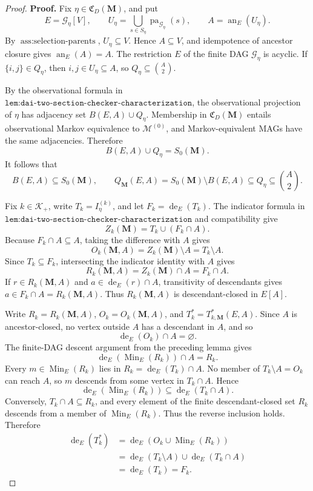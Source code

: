 \documentclass{article}
\begin{document}
\begin{proof}
\textbf{Proof.}
Fix \(\eta\in\mathfrak C_D(\mathbf M)\), and put
\[
E=\mathcal G_\eta[V],
\qquad
U_\eta=\bigcup_{s\in S_\eta}\operatorname{pa}_{\mathcal G_\eta}(s),
\qquad
A=\operatorname{an}_E(U_\eta).
\]
By \(\operatorname{ass{:}selection\text{-}parents}\), \(U_\eta\subseteq V\).  Hence \(A\subseteq V\), and idempotence of ancestor closure gives \(\operatorname{an}_E(A)=A\).  The restriction \(E\) of the finite DAG \(\mathcal G_\eta\) is acyclic.  If \(\{i,j\}\in Q_\eta\), then \(i,j\in U_\eta\subseteq A\), so \(Q_\eta\subseteq\binom A2\).

By the observational formula in \(\texttt{lem:dai-two-section-checker-characterization}\), the observational projection of \(\eta\) has adjacency set \(B(E,A)\cup Q_\eta\).  Membership in \(\mathfrak C_D(\mathbf M)\) entails observational Markov equivalence to \(\mathcal M^{(0)}\), and Markov-equivalent MAGs have the same adjacencies.  Therefore
\[
B(E,A)\cup Q_\eta=S_0(\mathbf M).
\]
It follows that
\[
B(E,A)\subseteq S_0(\mathbf M),
\qquad
Q_{\mathbf M}(E,A)
=S_0(\mathbf M)\setminus B(E,A)
\subseteq Q_\eta
\subseteq\binom A2.
\]

Fix \(k\in\mathcal K_+\), write \(T_k=I_\eta^{(k)}\), and let \(F_k=\operatorname{de}_E(T_k)\).  The indicator formula in \(\texttt{lem:dai-two-section-checker-characterization}\) and compatibility give
\[
Z_k(\mathbf M)=T_k\cup(F_k\cap A).
\]
Because \(F_k\cap A\subseteq A\), taking the difference with \(A\) gives
\[
O_k(\mathbf M,A)=Z_k(\mathbf M)\setminus A=T_k\setminus A.
\]
Since \(T_k\subseteq F_k\), intersecting the indicator identity with \(A\) gives
\[
R_k(\mathbf M,A)=Z_k(\mathbf M)\cap A=F_k\cap A.
\]
If \(r\in R_k(\mathbf M,A)\) and \(a\in\operatorname{de}_E(r)\cap A\), transitivity of descendants gives \(a\in F_k\cap A=R_k(\mathbf M,A)\).  Thus \(R_k(\mathbf M,A)\) is descendant-closed in \(E[A]\).

Write \(R_k=R_k(\mathbf M,A)\), \(O_k=O_k(\mathbf M,A)\), and \(T_k^*=T^*_{k,\mathbf M}(E,A)\).  Since \(A\) is ancestor-closed, no vertex outside \(A\) has a descendant in \(A\), and so
\[
\operatorname{de}_E(O_k)\cap A=\varnothing.
\]
The finite-DAG descent argument from the preceding lemma gives
\[
\operatorname{de}_E(\operatorname{Min}_E(R_k))\cap A=R_k.
\]
Every \(m\in\operatorname{Min}_E(R_k)\) lies in \(R_k=\operatorname{de}_E(T_k)\cap A\).  No member of \(T_k\setminus A=O_k\) can reach \(A\), so \(m\) descends from some vertex in \(T_k\cap A\).  Hence
\[
\operatorname{de}_E(\operatorname{Min}_E(R_k))
\subseteq\operatorname{de}_E(T_k\cap A).
\]
Conversely, \(T_k\cap A\subseteq R_k\), and every element of the finite descendant-closed set \(R_k\) descends from a member of \(\operatorname{Min}_E(R_k)\).  Thus the reverse inclusion holds.  Therefore
\[
\begin{aligned}
\operatorname{de}_E(T_k^*)
&=\operatorname{de}_E(O_k\cup\operatorname{Min}_E(R_k))\\
&=\operatorname{de}_E(T_k\setminus A)\cup\operatorname{de}_E(T_k\cap A)\\
&=\operatorname{de}_E(T_k)=F_k.
\end{aligned}
\]


\end{proof}
\end{document}
